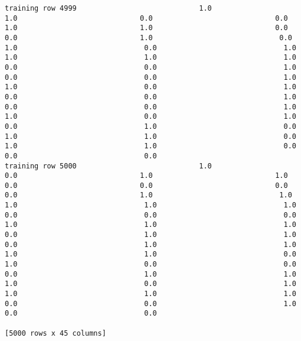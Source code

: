 \documentclass[11pt]{article}
\begin{document}
\begin{verbatim}
training row 4999                             1.0                             1.0                             0.0                             0.0                             1.0                             1.0                             0.0                             0.0                             1.0                              0.0                              1.0                              0.0                              1.0                              1.0                              1.0                              1.0                              0.0                              0.0                              1.0                              0.0                              0.0                              1.0                              1.0                              0.0                              1.0                              0.0                              0.0                              1.0                              0.0                              0.0                              1.0                              1.0                              0.0                              1.0                              0.0                              1.0                              0.0                              1.0                              1.0                              0.0                              1.0                              1.0                              0.0                              0.0                              0.0
training row 5000                             1.0                             0.0                             1.0                             1.0                             0.0                             0.0                             0.0                             0.0                             1.0                              1.0                              1.0                              1.0                              1.0                              0.0                              0.0                              0.0                              1.0                              1.0                              1.0                              0.0                              1.0                              1.0                              0.0                              1.0                              1.0                              1.0                              1.0                              0.0                              1.0                              0.0                              0.0                              0.0                              1.0                              1.0                              1.0                              0.0                              1.0                              1.0                              1.0                              1.0                              0.0                              0.0                              1.0                              0.0                              0.0

[5000 rows x 45 columns]
    \end{verbatim}
\end{document}
